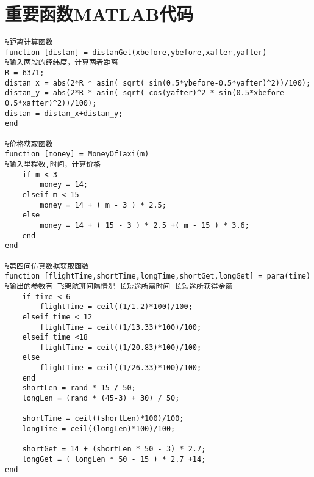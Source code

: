 \documentclass[withoutpreface,bwprint]{cumcmthesis} %
\begin{document}
\section{重要函数MATLAB代码}
\begin{lstlisting}
%距离计算函数
function [distan] = distanGet(xbefore,ybefore,xafter,yafter)
%输入两段的经纬度，计算两者距离
R = 6371;
distan_x = abs(2*R * asin( sqrt( sin(0.5*ybefore-0.5*yafter)^2))/100);
distan_y = abs(2*R * asin( sqrt( cos(yafter)^2 * sin(0.5*xbefore-0.5*xafter)^2))/100);
distan = distan_x+distan_y;  
end

%价格获取函数
function [money] = MoneyOfTaxi(m)
%输入里程数,时间，计算价格
    if m < 3
        money = 14;
    elseif m < 15
        money = 14 + ( m - 3 ) * 2.5;
    else
        money = 14 + ( 15 - 3 ) * 2.5 +( m - 15 ) * 3.6;
    end
end

%第四问仿真数据获取函数
function [flightTime,shortTime,longTime,shortGet,longGet] = para(time)
%输出的参数有 飞架航班间隔情况 长短途所需时间 长短途所获得金额
    if time < 6
        flightTime = ceil((1/1.2)*100)/100;      
    elseif time < 12
        flightTime = ceil((1/13.33)*100)/100;  
    elseif time <18
        flightTime = ceil((1/20.83)*100)/100;
    else
        flightTime = ceil((1/26.33)*100)/100;   
    end
    shortLen = rand * 15 / 50;
    longLen = (rand * (45-3) + 30) / 50;
    
    shortTime = ceil((shortLen)*100)/100;
    longTime = ceil((longLen)*100)/100;
    
    shortGet = 14 + (shortLen * 50 - 3) * 2.7;
    longGet = ( longLen * 50 - 15 ) * 2.7 +14;
end


\end{lstlisting}
\newpage
\end{document}
